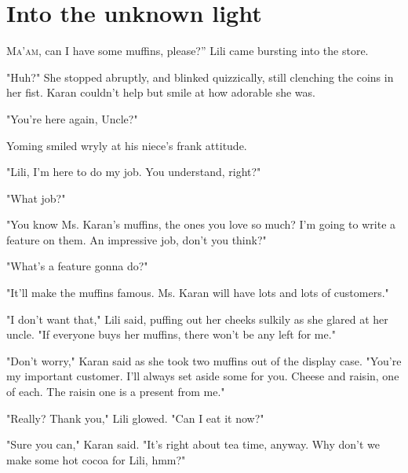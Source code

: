 
\chapter{Into the unknown light}


\lettrine[ante=``]{M}{a'am}, can I have some muffins, please?'' Lili came bursting into the
store.

"Huh?" She stopped abruptly, and blinked quizzically, still clenching
the coins in her fist. Karan couldn't help but smile at how adorable she
was.

"You're here again, Uncle?"

Yoming smiled wryly at his niece's frank attitude.

"Lili, I'm here to do my job. You understand, right?"~

"What job?"

"You know Ms. Karan's muffins, the ones you love so much? I'm going to
write a feature on them. An impressive job, don't you think?"

"What's a feature gonna do?"

"It'll make the muffins famous. Ms. Karan will have lots and lots of
customers."

"I don't want that," Lili said, puffing out her cheeks sulkily as she
glared at her uncle. "If everyone buys her muffins, there won't be any
left for me."

"Don't worry," Karan said as she took two muffins out of the display
case. "You're my important customer. I'll always set aside some for you.
Cheese and raisin, one of each. The raisin one is a present from me."

"Really? Thank you," Lili glowed. "Can I eat it now?"

"Sure you can," Karan said. "It's right about tea time, anyway. Why
don't we make some hot cocoa for Lili, hmm?"


